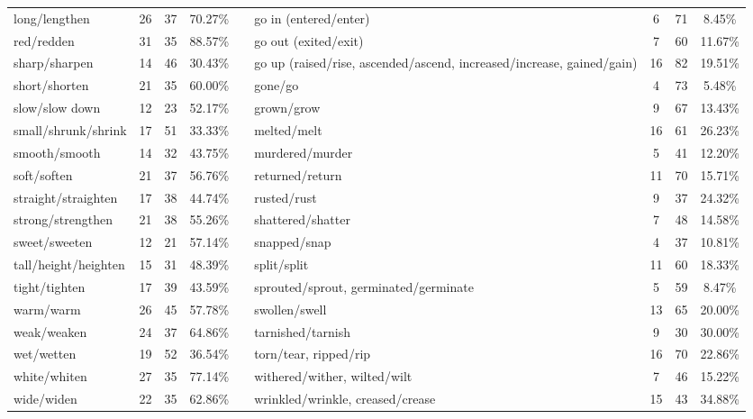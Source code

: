 \begin{tabular}{p{3cm}ccccp{3cm}ccc}
long/lengthen & 26 & 37 & 70.27\% & & go in (entered/enter) & 6 & 71 & 8.45\% \\
red/redden & 31 & 35 & 88.57\% & & go out (exited/exit) & 7 & 60 & 11.67\% \\
sharp/sharpen & 14 & 46 & 30.43\% & & go up (raised/rise, ascended/ascend, increased/increase, gained/gain) & 16 & 82 & 19.51\% \\
short/shorten & 21 & 35 & 60.00\% & & gone/go & 4 & 73 & 5.48\% \\
slow/slow down & 12 & 23 & 52.17\% & & grown/grow & 9 & 67 & 13.43\% \\
small/shrunk/shrink & 17 & 51 & 33.33\% & & melted/melt & 16 & 61 & 26.23\% \\
smooth/smooth & 14 & 32 & 43.75\% & & murdered/murder & 5 & 41 & 12.20\% \\
soft/soften & 21 & 37 & 56.76\% & & returned/return & 11 & 70 & 15.71\% \\
straight/straighten & 17 & 38 & 44.74\% & & rusted/rust & 9 & 37 & 24.32\% \\
strong/strengthen & 21 & 38 & 55.26\% & & shattered/shatter & 7 & 48 & 14.58\% \\
sweet/sweeten & 12 & 21 & 57.14\% & & snapped/snap & 4 & 37 & 10.81\% \\
tall/height/heighten & 15 & 31 & 48.39\% & & split/split & 11 & 60 & 18.33\% \\
tight/tighten & 17 & 39 & 43.59\% & & sprouted/sprout, germinated/germinate & 5 & 59 & 8.47\% \\
warm/warm & 26 & 45 & 57.78\% & & swollen/swell & 13 & 65 & 20.00\% \\
weak/weaken & 24 & 37 & 64.86\% & & tarnished/tarnish & 9 & 30 & 30.00\% \\
wet/wetten & 19 & 52 & 36.54\% & & torn/tear, ripped/rip & 16 & 70 & 22.86\% \\
white/whiten & 27 & 35 & 77.14\% & & withered/wither, wilted/wilt & 7 & 46 & 15.22\% \\
wide/widen & 22 & 35 & 62.86\% & & wrinkled/wrinkle, creased/crease & 15 & 43 & 34.88\%
\end{tabular}